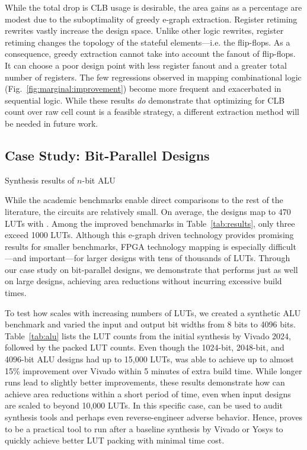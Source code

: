 While the total drop is CLB usage is desirable, the area gains as a percentage
are modest due to the suboptimality of greedy e-graph extraction. Register
retiming rewrites vastly increase the design space. Unlike other logic
rewrites, register retiming changes the topology of the stateful
elements---i.e. the flip-flops. As a consequence, greedy extraction cannot take
into account the fanout of flip-flops. It can choose a poor design point with
less register fanout and a greater total number of registers. The few
regressions observed in mapping combinational logic
(Fig.~\ref{fig:marginal:improvement}) become more frequent and exacerbated in
sequential logic. While these results \textit{do} demonstrate that optimizing
for CLB count over raw cell count is a feasible strategy, a different
extraction method will be needed in future work.

\subsection{Case Study: Bit-Parallel Designs}\label{sec:results:scalability}
\begin{table}
    \centering
    \caption{Synthesis results of $n$-bit ALU}\label{tab:alu}
\end{table}

While the academic benchmarks enable direct comparisons to the rest of the
literature, the circuits are relatively small. On average, the designs map to
470 LUTs with \shortname{}. Among the \nimproved{} improved benchmarks in
Table~\ref{tab:results}, only three exceed 1000 LUTs. Although this e-graph
driven technology provides promising results for smaller benchmarks, FPGA
technology mapping is especially difficult---and important---for larger designs
with tens of thousands of LUTs. Through our case study on bit-parallel designs,
we demonstrate that \shortname{} performs just as well on large designs,
achieving area reductions without incurring excessive build times.

To test how \shortname{} scales with increasing numbers of LUTs, we created a
synthetic ALU benchmark and varied the input and output bit widths from 8 bits
to 4096 bits. Table~\ref{tab:alu} lists the LUT counts from the initial
synthesis by Vivado 2024, followed by the packed LUT counts. Even though the
1024-bit, 2048-bit, and 4096-bit ALU designs had up to 15,000 LUTs,
\shortname{} was able to achieve up to almost 15\% improvement over Vivado
within 5 minutes of extra build time. While longer runs lead to slightly better
improvements, these results demonstrate how \shortname{} can achieve area
reductions within a short period of time, even when input designs are scaled to
beyond 10,000 LUTs. In this specific case, \shortname{} can be used to audit
synthesis tools and perhaps even reverse-engineer adverse behavior. Hence,
\shortname{} proves to be a practical tool to run after a baseline synthesis by
Vivado or Yosys to quickly achieve better LUT packing with minimal time cost.
